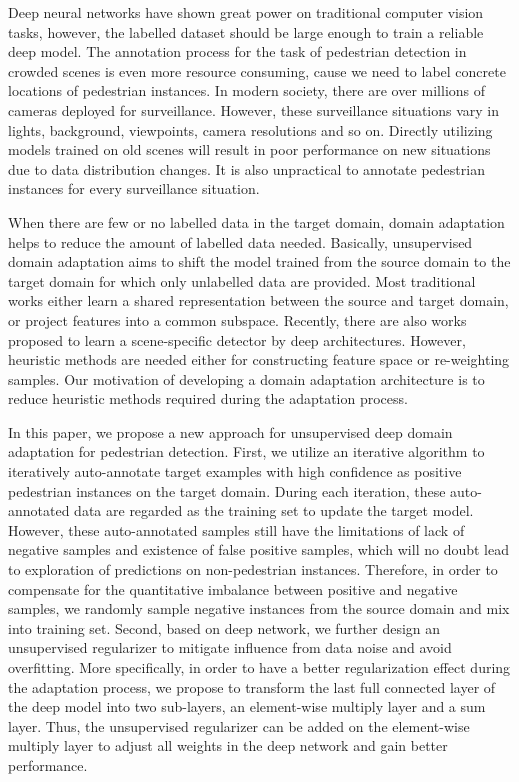\documentclass[runningheads]{llncs}
\begin{document}
Deep neural networks have shown great power on traditional computer vision tasks, however, the labelled dataset should be large enough to train a reliable deep model. The annotation process for the task of pedestrian detection in crowded scenes is even more resource consuming, cause we need to label concrete locations of pedestrian instances. In modern society, there are over millions of cameras deployed for surveillance. However, these surveillance situations vary in lights, background, viewpoints, camera resolutions and so on. Directly utilizing models trained on old scenes will result in poor performance on new situations due to data distribution changes. It is also unpractical to annotate pedestrian instances for every surveillance situation.

When there are few or no labelled data in the target domain, domain adaptation helps to reduce the amount of labelled data needed. Basically, unsupervised domain adaptation aims to shift the model trained from the source domain to the target domain for which only unlabelled data are provided. Most traditional works \cite{saenko2010adapting,kulis2011you,gopalan2011domain,huang2006correcting,gretton2009covariate} either learn a shared representation between the source and target domain, or project features into a common subspace. Recently, there are also works \cite{wang2014scene,zeng2014deep,hattori2015learning} proposed to learn a scene-specific detector by deep architectures. However, heuristic methods are needed either for constructing feature space or re-weighting samples. Our motivation of developing a domain adaptation architecture is to reduce heuristic methods required during the adaptation process.

In this paper, we propose a new approach for unsupervised deep domain adaptation for pedestrian detection. First, we utilize an iterative algorithm to iteratively auto-annotate target examples with high confidence as positive pedestrian instances on the target domain. During each iteration, these auto-annotated data are regarded as the training set to update the target model. However, these auto-annotated samples still have the limitations of lack of negative samples and existence of false positive samples, which will no doubt lead to exploration of predictions on non-pedestrian instances. Therefore, in order to compensate for the quantitative imbalance between positive and negative samples, we randomly sample negative instances from the source domain and mix into training set. Second, based on deep network, we further design an unsupervised regularizer to mitigate influence from data noise and avoid overfitting. More specifically, in order to have a better regularization effect during the adaptation process, we propose to transform the last full connected layer of the deep model into two sub-layers, an element-wise multiply layer and a sum layer. Thus, the unsupervised regularizer can be added on the element-wise multiply layer to adjust all weights in the deep network and gain better performance.
\end{document}
